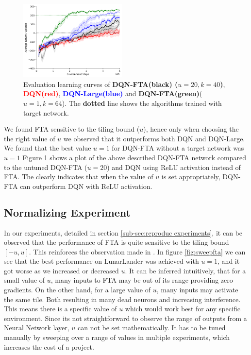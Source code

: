 \documentclass{article}
\begin{document}
\begin{figure}[h]
    \centering
    \includegraphics[height=4cm]{bestfta.png}
    \caption{Evaluation learning curves of {\bf DQN-FTA(black) ($u=20, k = 40$)}, {\textcolor{red} {\bf DQN(red)}},  {\textcolor{blue} {\bf DQN-Large(blue)}} and {\textcolor{mygreen} {\bf DQN-FTA(green)}($u=1, k=64$)}. The {\bf dotted} line shows the algorithms trained with target network.}
    \label{fig:bestfta}
\end{figure}

We found FTA sensitive to the tiling bound ($u$), hence only when choosing the the right value of $u$ we observed that it outperforms both DQN and DQN-Large.
We found that the best value $u=1$ for DQN-FTA without a target network was $u=1$
Figure \ref{fig:bestfta} shows a plot of the above described DQN-FTA network compared to the untuned DQN-FTA ($u=20$) and DQN using ReLU activation instead of FTA.
The clearly indicates that when the value of $u$ is set appropriately, DQN-FTA can outperform DQN with ReLU activation.

\subsection{Normalizing Experiment} \label{sub-sec:normalize experiments}
In our experiments, detailed in section \ref{sub-sec:reproduc experiments}, it can be observed that the performance of FTA is quite sensitive to the tiling bound $[-u, u]$. 
This reinforces the observation made in \cite{pan2019fuzzy}. 
In figure \ref{fig:sweepfta} we can see that the best performance on LunarLander was achieved with $u=1$, and it got worse as we increased or decreased $u$.
It can be inferred intuitively, that for a small value of $u$, many inputs to FTA may be out of its range providing zero gradients. 
On the other hand, for a large value of $u$, many inputs may activate the same tile. 
Both resulting in many dead neurons and increasing interference. 
This means there is a specific value of $u$ which would work best for any specific environment. 
Since its not straightforward to observe the range of outputs from a Neural Network layer, $u$ can not be set mathematically. 
It has to be tuned manually by sweeping over a range of values in multiple experiments, which increases the cost of a project.
\end{document}

